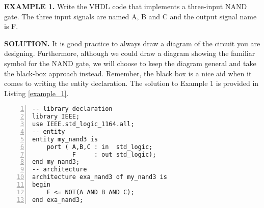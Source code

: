 \begin{leftbar}
\noindent
\textbf{EXAMPLE 1.}
Write the VHDL code that implements a three-input NAND gate. The three input signals are named A, B and C and the output signal name is F. 
\end{leftbar}
\noindent
\textbf{SOLUTION.} It is good practice to always draw a diagram of the circuit you are designing. Furthermore, although we could draw a diagram showing the familiar symbol for the NAND gate, we will choose to keep the diagram general and take the black-box approach instead. Remember, the black box is a nice aid when it comes to writing the entity declaration. The solution to Example 1 is provided in Listing \ref{example_1}.

\noindent
\begin{minipage}{0.55\linewidth}
\begin{lstlisting}[numbers=left,label=example_1, caption=Solution of Example 1.]
-- library declaration
library IEEE;
use IEEE.std_logic_1164.all;
-- entity
entity my_nand3 is
	port ( A,B,C : in  std_logic;
	       F     : out std_logic);
end my_nand3;
-- architecture
architecture exa_nand3 of my_nand3 is
begin
	F <= NOT(A AND B AND C);
end exa_nand3;
\end{lstlisting}
\end{minipage}
\begin{minipage}{0.4\linewidth}
\begin{flushright}
\end{flushright}
\end{minipage}

